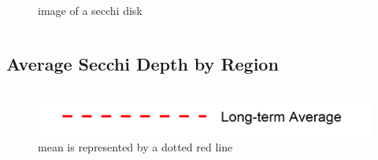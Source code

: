 \documentclass[
]{book}
\begin{document}
\begin{columns-nocenter}
\begin{column}
\begin{figure}
{}

\caption{image of a secchi disk}\label{fig:unnamed-chunk-94}
\end{figure}

\end{column}

\end{columns-nocenter}

\hypertarget{average-secchi-depth-by-region}{%
\subsection{Average Secchi Depth by Region}\label{average-secchi-depth-by-region}}

\begin{columns-nocenter}

\begin{column}

\begin{figure}
\includegraphics[width=15.25in]{figures/mline} \caption{mean is represented by a dotted red line}\label{fig:unnamed-chunk-95}
\end{figure}

\end{column}

\begin{column}

\end{column}

\begin{column}

\end{column}

\end{columns-nocenter}
\end{document}
